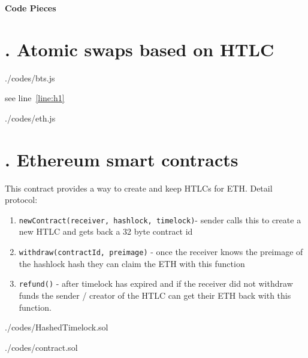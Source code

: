 \begin{huge}
\textbf{Code Pieces}
\end{huge}






\section{\uppercase\expandafter{}. Atomic swaps based on HTLC}

\begin{lstinputlisting}[language=JavaScript,  
						caption=Bitshares side, 	
						firstline = 10, 
						lastline = 50,
						escapechar=@]{./codes/bts.js}
\end{lstinputlisting}
see line~\ref{line:h1}

\begin{lstinputlisting}[language=JavaScript, 
						caption=Ethereum Side, 
						firstline=20,
						lastline=50]{./codes/eth.js}	
\end{lstinputlisting}

\section{\uppercase\expandafter{}. Ethereum smart contracts}

\noindent This contract provides a way to create and keep
HTLCs for ETH. Detail protocol:

\begin{enumerate}
	\item \texttt{newContract(receiver, hashlock, timelock)}- sender calls this to create a new HTLC and gets back a 32 byte contract id
	\item \texttt{withdraw(contractId, preimage)} - once the receiver knows the preimage of the hashlock hash they can claim the ETH with this function
	\item \texttt{refund()} - after timelock has expired and if the receiver did not withdraw funds the sender / creator of the HTLC can get their ETH back with this function.
\end{enumerate}
  

\begin{lstinputlisting}[language=Solidity, 
						firstline = 12, 
						lastline =40, 
						caption = Hashed Timelock Contracts (HTLCs) on Ethereum]{./codes/HashedTimelock.sol}

\end{lstinputlisting}


\begin{lstinputlisting}[language=Solidity, 
						firstline=20, 
						lastline=50, 
						caption= Ethereum micro-payment channel -- Machinomy]{./codes/contract.sol}
	
\end{lstinputlisting}



